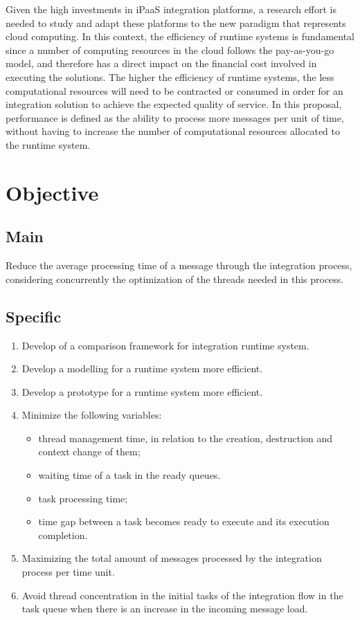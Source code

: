 Given the high investments in iPaaS integration platforms, a research effort is needed to study and adapt these platforms to the new paradigm that represents cloud computing. In this context, the efficiency of runtime systems is fundamental since a number of computing resources in the cloud follows the pay-as-you-go model, and therefore has a direct impact on the financial cost involved in executing the solutions. The higher the efficiency of runtime systems, the less computational resources will need to be contracted or consumed in order for an integration solution to achieve the expected quality of service. In this proposal, performance is defined as the ability to process more messages per unit of time, without having to increase the number of computational resources allocated to the runtime system.
\section{Objective}

\subsection{Main}

Reduce the average processing time of a message through the integration process, considering concurrently the optimization of the threads needed in this process.

\subsection{Specific}

\begin{enumerate}%
    \item Develop of a comparison framework for integration runtime system.
    \item Develop a modelling for a runtime system more efficient.
    \item Develop a prototype for a runtime system more efficient.
	\item Minimize the following variables:
    \begin{itemize}
    	\item thread management time, in relation to the creation, destruction and context change of them;
		\item waiting time of a task in the ready queues.
		\item task processing time;
    	\item time gap between a task becomes ready to execute and its execution completion.
    \end{itemize}
	\item Maximizing the total amount of messages processed by the integration process per time unit.
		\item Avoid thread concentration in the initial tasks of the integration flow in the task queue when there is an increase in the incoming message load.
	\end{enumerate}
    
